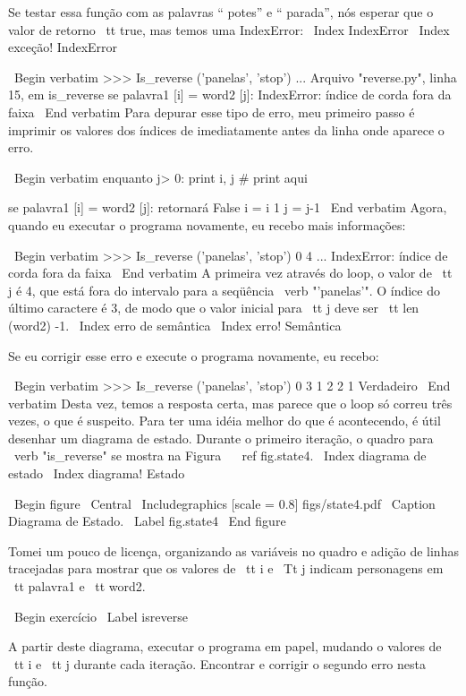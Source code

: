 \documentclass[10pt]{book}
\begin{document}
\begin {itemize}
{{{{{{Se testar essa função com as palavras `` potes'' e `` parada'', nós
esperar que o valor de retorno {\ tt true}, mas temos uma IndexError:
\ Index {} IndexError
\ Index {exceção! IndexError}

\ Begin {verbatim}
>>> Is_reverse ('panelas', 'stop')
...
  Arquivo "reverse.py", linha 15, em is_reverse
    se palavra1 [i] = word2 [j]:
IndexError: índice de corda fora da faixa
\ End {verbatim}
%
Para depurar esse tipo de erro, meu primeiro passo é
imprimir os valores dos índices de imediatamente antes da linha
onde aparece o erro.

\ Begin {verbatim}
    enquanto j> 0:
        print i, j # print aqui
        
        se palavra1 [i] = word2 [j]:
            retornará False
        i = i 1
        j = j-1
\ End {verbatim}
%
Agora, quando eu executar o programa novamente, eu recebo mais informações:

\ Begin {verbatim}
>>> Is_reverse ('panelas', 'stop')
0 4
...
IndexError: índice de corda fora da faixa
\ End {verbatim}
%
A primeira vez através do loop, o valor de {\ tt j} é 4,
que está fora do intervalo para a seqüência \ verb "'panelas'".
O índice do último caractere é 3, de modo que o
valor inicial para {\ tt j} deve ser {\ tt len ​​(word2) -1}.
\ Index {erro de semântica}
\ Index {erro! Semântica}

Se eu corrigir esse erro e execute o programa novamente, eu recebo:

\ Begin {verbatim}
>>> Is_reverse ('panelas', 'stop')
0 3
1 2
2 1
Verdadeiro
\ End {verbatim}
%
Desta vez, temos a resposta certa, mas parece que o loop só correu
três vezes, o que é suspeito. Para ter uma idéia melhor do que é
acontecendo, é útil desenhar um diagrama de estado. Durante o primeiro
iteração, o quadro para \ verb "is_reverse" se mostra na Figura ~ \ ref {} fig.state4.
\ Index {diagrama de estado}
\ Index {diagrama! Estado}

\ Begin {figure}
\ Central
{\ Includegraphics [scale = 0.8] {figs/state4.pdf}}
\ Caption {Diagrama de Estado.}
\ Label {} fig.state4
\ End {figure}


Tomei um pouco de licença, organizando as variáveis ​​no quadro
e adição de linhas tracejadas para mostrar que os valores de {\ tt i} e
{\ Tt j} indicam personagens em {\ tt palavra1} e {\ tt word2}.

\ Begin {} exercício
\ Label {} isreverse

A partir deste diagrama, executar o programa em papel, mudando o
valores de {\ tt i} e {\ tt j} durante cada iteração. Encontrar e corrigir o
segundo erro nesta função.

}}}}}}
\end{itemize}
\end{document}
